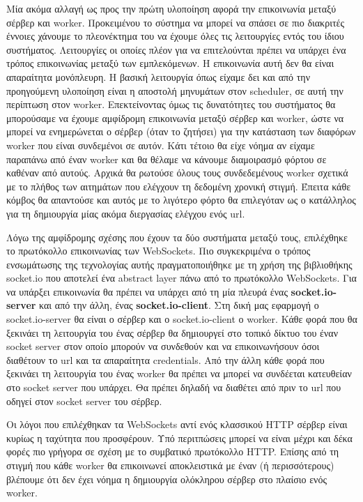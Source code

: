 Μία ακόμα αλλαγή ως προς την πρώτη υλοποίηση αφορά την επικοινωνία μεταξύ σέρβερ και worker. Προκειμένου το σύστημα να
μπορεί να σπάσει σε πιο διακριτές έννοιες χάνουμε το πλεονέκτημα του να έχουμε όλες τις λειτουργίες εντός του ίδιου συστήματος.
Λειτουργίες οι οποίες πλέον για να επιτελούνται πρέπει να υπάρχει ένα τρόπος επικοινωνίας μεταξύ των εμπλεκόμενων.
Η επικοινωνία αυτή δεν θα είναι απαραίτητα μονόπλευρη. Η βασική λειτουργία όπως είχαμε δει και από την προηγούμενη υλοποίηση
είναι η αποστολή μηνυμάτων στον scheduler, σε αυτή την περίπτωση στον worker. Επεκτείνοντας όμως τις δυνατότητες του συστήματος
θα μπορούσαμε να έχουμε αμφίδρομη επικοινωνία μεταξύ σέρβερ και worker, ώστε να μπορεί να ενημερώνεται ο σέρβερ (όταν το ζητήσει) για την
κατάσταση των διαφόρων worker που είναι συνδεμένοι σε αυτόν. Κάτι τέτοιο θα είχε νόημα αν είχαμε παραπάνω από έναν worker και θα θέλαμε να κάνουμε
διαμοιρασμό φόρτου σε καθέναν από αυτούς. Αρχικά θα ρωτούσε όλους τους συνδεδεμένους worker σχετικά με το πλήθος των αιτημάτων
που ελέγχουν τη δεδομένη χρονική στιγμή. Έπειτα κάθε κόμβος θα απαντούσε και αυτός με το λιγότερο φόρτο θα επιλεγόταν ως ο κατάλληλος 
για τη δημιουργία μίας ακόμα διεργασίας ελέγχου ενός url.

Λόγω της αμφίδρομης σχέσης που έχουν τα δύο συστήματα μεταξύ τους, επιλέχθηκε το πρωτόκολλο επικοινωνίας των WebSockets.
Πιο συγκεκριμένα ο τρόπος ενσωμάτωσης της τεχνολογίας αυτής πραγματοποιήθηκε με τη χρήση της βιβλιοθήκης socket.io που αποτελεί ένα
abstract layer πάνω από το πρωτόκολλο WebSockets. Για να υπάρξει επικοινωνία θα πρέπει να υπάρχει από τη μία πλευρά ένας \textbf{socket.io-server} και από την άλλη, ένας \textbf{socket.io-client}.
Στη δική μας εφαρμογή ο socket.io-server θα είναι ο σέρβερ και ο socket.io-client ο worker. Κάθε φορά που θα ξεκινάει τη λειτουργία του ένας σέρβερ θα δημιουργεί στο τοπικό δίκτυο του
έναν socket server στον οποίο μπορούν να συνδεθούν και να επικοινωνήσουν όσοι διαθέτουν το url και τα απαραίτητα credentials. Από την άλλη
κάθε φορά που ξεκινάει τη λειτουργία του ένας worker θα πρέπει να μπορεί να συνδέεται κατευθείαν στο socket server που υπάρχει.
Θα πρέπει δηλαδή να διαθέτει από πριν το url που οδηγεί στον socket server του σέρβερ.

Οι λόγοι που επιλέχθηκαν τα WebSockets αντί ενός κλασσικού HTTP σέρβερ είναι κυρίως η ταχύτητα που προσφέρουν. Υπό περιτπώσεις
μπορεί να είναι μέχρι και δέκα φορές πιο γρήγορα σε σχέση με το συμβατικό πρωτόκολλο HTTP. Επίσης από τη στιγμή που κάθε worker 
θα επικοινωνεί αποκλειστικά με έναν (ή περισσότερους) βλέπουμε ότι δεν έχει νόημα η δημιουργία ολόκληρου σέρβερ στο πλαίσιο ενός worker.

